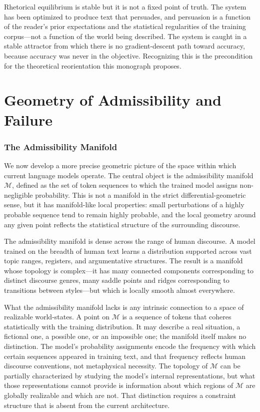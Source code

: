 \documentclass[11pt, oneside]{article}
\begin{document}
Rhetorical equilibrium is stable but it is not a fixed point of truth. The system has been optimized to produce text that persuades, and persuasion is a function of the reader's prior expectations and the statistical regularities of the training corpus---not a function of the world being described. The system is caught in a stable attractor from which there is no gradient-descent path toward accuracy, because accuracy was never in the objective. Recognizing this is the precondition for the theoretical reorientation this monograph proposes.

\part{Geometry of Admissibility and Failure}

\section{The Admissibility Manifold}

We now develop a more precise geometric picture of the space within which current language models operate. The central object is the admissibility manifold $\mathcal{M}$, defined as the set of token sequences to which the trained model assigns non-negligible probability. This is not a manifold in the strict differential-geometric sense, but it has manifold-like local properties: small perturbations of a highly probable sequence tend to remain highly probable, and the local geometry around any given point reflects the statistical structure of the surrounding discourse.

The admissibility manifold is dense across the range of human discourse. A model trained on the breadth of human text learns a distribution supported across vast topic ranges, registers, and argumentative structures. The result is a manifold whose topology is complex---it has many connected components corresponding to distinct discourse genres, many saddle points and ridges corresponding to transitions between styles---but which is locally smooth almost everywhere.

What the admissibility manifold lacks is any intrinsic connection to a space of realizable world-states. A point on $\mathcal{M}$ is a sequence of tokens that coheres statistically with the training distribution. It may describe a real situation, a fictional one, a possible one, or an impossible one; the manifold itself makes no distinction. The model's probability assignments encode the frequency with which certain sequences appeared in training text, and that frequency reflects human discourse conventions, not metaphysical necessity. The topology of $\mathcal{M}$ can be partially characterized by studying the model's internal representations, but what those representations cannot provide is information about which regions of $\mathcal{M}$ are globally realizable and which are not. That distinction requires a constraint structure that is absent from the current architecture.
\end{document}
